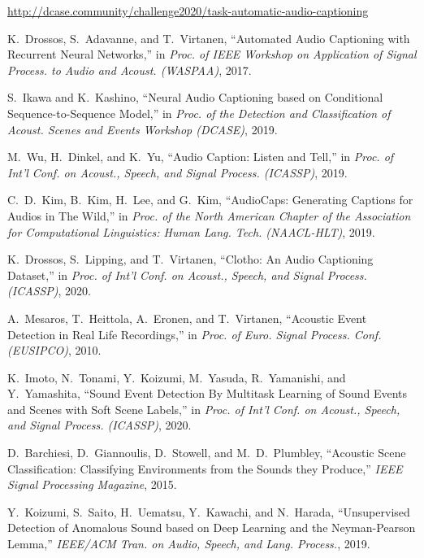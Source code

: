 \documentclass{article}
\begin{document}
\begin{sloppy}
\newpage
\begin{thebibliography}{99}
 \url{http://dcase.community/challenge2020/task-automatic-audio-captioning}


 K.\ Drossos, S.\ Adavanne, and T.\ Virtanen,
``Automated Audio Captioning with Recurrent Neural Networks,''
in \textit{Proc. of IEEE Workshop on Application of Signal Process. to Audio and Acoust. (WASPAA)}, 2017.

 S.\ Ikawa and K.\ Kashino,
``Neural Audio Captioning based on Conditional Sequence-to-Sequence Model,''
in \textit{Proc. of the Detection and Classification of Acoust. Scenes and Events Workshop (DCASE)}, 2019.

 M.\ Wu, H.\ Dinkel, and K.\ Yu,
``Audio Caption: Listen and Tell,''
in \textit{Proc. of Int'l Conf. on Acoust., Speech, and Signal Process. (ICASSP)}, 2019.

 C.\ D.\ Kim, B.\ Kim, H.\ Lee, and G.\ Kim,
``AudioCaps: Generating Captions for Audios in The Wild,''
in \textit{Proc. of the North American Chapter of the Association for Computational Linguistics: Human Lang. Tech. (NAACL-HLT)}, 2019.

 K.\ Drossos, S.\ Lipping, and T.\ Virtanen,
``Clotho: An Audio Captioning Dataset,''
in \textit{Proc. of Int'l Conf. on Acoust., Speech, and Signal Process. (ICASSP)}, 2020.

 A.\ Mesaros, T.\ Heittola, A.\ Eronen, and T.\ Virtanen,
``Acoustic Event Detection in Real Life Recordings,''
in \textit{Proc. of Euro. Signal Process. Conf. (EUSIPCO)}, 2010.

 K.\ Imoto, N.\ Tonami, Y.\ Koizumi, M.\ Yasuda, R.\ Yamanishi, and Y.\ Yamashita,
``Sound Event Detection By Multitask Learning of Sound Events and Scenes with Soft Scene Labels,''
in \textit{Proc. of Int'l Conf. on Acoust., Speech, and Signal Process. (ICASSP)}, 2020.

 D.\ Barchiesi, D.\ Giannoulis, D.\ Stowell, and M.\ D.\ Plumbley,
``Acoustic Scene Classification: Classifying Environments from the Sounds they Produce,''
\textit{IEEE Signal Processing Magazine}, 2015.

 Y.\ Koizumi, S.\ Saito, H.\ Uematsu, Y.\ Kawachi, and N.\ Harada,
``Unsupervised Detection of Anomalous Sound based on Deep Learning and the Neyman-Pearson Lemma,''
\textit{IEEE/ACM Tran. on Audio, Speech, and Lang. Process.}, 2019.




\end{thebibliography}
\end{sloppy}
\end{document}
